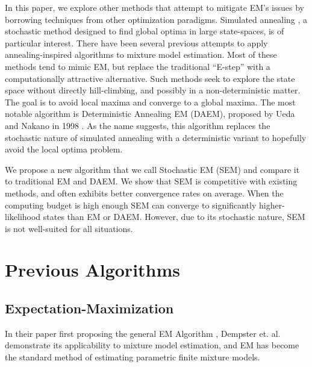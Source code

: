\documentclass{article}
\theoremstyle{definition}
\theoremstyle{algodesc}
\begin{document}
In this paper, we explore other methods that attempt to mitigate EM's issues by borrowing techniques from other optimization paradigms. Simulated annealing \cite{kirkpatrickgelattvecchi83}, a stochastic method designed to find global optima in large state-spaces, is of particular interest. There have been several previous attempts to apply annealing-inspired algorithms to mixture model estimation. Most of these methods tend to mimic EM, but replace the traditional ``E-step'' with a computationally attractive alternative. Such methods seek to explore the state space without directly hill-climbing, and possibly in a non-deterministic matter. The goal is to avoid local maxima and converge to a global maxima. The most notable algorithm is Deterministic Annealing EM (DAEM), proposed by Ueda and Nakano in 1998 \cite{uedanakano98}. As the name suggests, this algorithm replaces the stochastic nature of simulated annealing with a deterministic variant to hopefully avoid the local optima problem.

We propose a new algorithm that we call Stochastic EM (SEM) and compare it to traditional EM and DAEM. We show that SEM is competitive with existing methods, and often exhibits better convergence rates on average. When the computing budget is high enough SEM can converge to significantly higher-likelihood states than EM or DAEM. However, due to its stochastic nature, SEM is not well-suited for all situations.


\section{Previous Algorithms} \label{sec:prev_algos}


\subsection{Expectation-Maximization}

In their paper first proposing the general EM Algorithm \cite{dempsterlairdrubin77}, Dempster et. al. demonstrate its applicability to mixture model estimation, and EM has become the standard method of estimating parametric finite mixture models.
\end{document}
